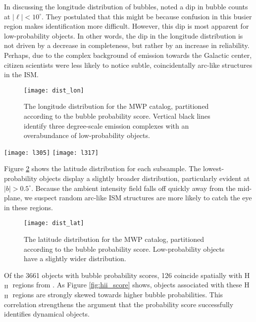 \documentclass[preprint]{aastex}
\newcommand{\hii}[0]{H$_{\rm II}$}
\begin{document}
In discussing the longitude distribution of bubbles, \cite{Simpson12} noted a dip in bubble counts at $|\ell| < 10^\circ$. They postulated that this might be because confusion in this busier region makes identification more difficult. However, this dip is most apparent for low-probability objects. In other words, the dip in the longitude distribution is not driven by a decrease in completeness, but rather by an increase in reliability. Perhaps, due to the complex background of emission towards the Galactic center, citizen scientists were less likely to notice subtle, coincidentally arc-like structures in the ISM.

\begin{figure}[h!]
\texttt{[image: dist\_lon]}
\caption{The longitude distribution for the MWP catalog, partitioned according to the bubble probability score.
Vertical black lines identify three degree-scale emission complexes with an overabundance of low-probability objects.}
\label{fig:dist_lon}
\end{figure}


\begin{figure*}
\texttt{[image: l305]}
\texttt{[image: l317]}
\caption{Two fields with overabundances of low-probability bubbles in the MWP catalog.}
\label{fig:wide_fields}
\end{figure*}

Figure \ref{fig:dist_lat} shows the latitude distribution for each subsample. The lowest-probability objects display a slightly broader distribution, particularly evident at $|b| > 0.5^\circ$. Because the ambient intensity field falls off quickly away from the mid-plane, we suspect random arc-like ISM structures are more likely to catch the eye in these regions. 

\begin{figure}[h!]
\texttt{[image: dist\_lat]}
\caption{The latitude distribution for the MWP catalog, partitioned according to the bubble probability score.
Low-probability objects have a slightly wider distribution.}
\label{fig:dist_lat}
\end{figure}

Of the 3661 objects with bubble probability scores, 126 coincide spatially with \hii\, regions from \cite{Anderson11}. As Figure \ref{fig:hii_score} shows, objects associated with these \hii\, regions are strongly skewed towards higher bubble probabilities. This correlation strengthens the argument that the probability score successfully identifies dynamical objects.
\end{document}
